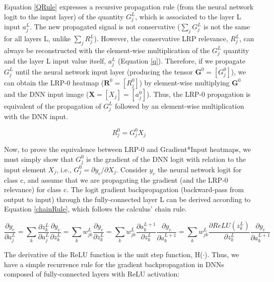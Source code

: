 \documentclass[fleqn,10pt]{wlscirep}
\begin{document}
{Equation \ref{QRule} expresses a recursive propagation rule (from the neural network logit to the input layer) of the quantity $G_{j}^{L}$, which is associated to the layer 
L input $a_{j}^{L}$. The new propagated signal is not conservative ($\sum_{j} G_{j}^{L}$ is not the same for all layers L, unlike $\sum_{j} R_{j}^{L}$). However, the conservative LRP relevance, $R_{j}^{L}$, can always be reconstructed with the element-wise multiplication of the $G_{j}^{L}$ quantity and the layer L input value itself, $a_{j}^{L}$ (Equation \ref{q}). Therefore, if we propagate $G_{j}^{L}$ until the neural network input layer (producing the tensor $\bm{G}^{0}=[G_{j}^{0}]$), we can obtain the LRP-0 heatmap ($\bm{R}^{0}=[R_{j}^{0}]$) by element-wise multiplying $\bm{G}^{0}$ and the DNN input image ($\bm{X}=[X_{j}]=[a_{j}^{0}]$). Thus, the LRP-0 propagation is equivalent of the propagation of $G_{j}^{L}$ followed by an element-wise multiplication with the DNN input.

\begin{equation}
R_{j}^{0}=G_{j}^{0}X_{j}
\end{equation}

Now, to prove the equivalence between LRP-0 and Gradient*Input heatmaps, we must simply show that $G_{j}^{0}$ is the gradient of the DNN logit with relation to the input element $X_{j}$, i.e., $G_{j}^{0}=\partial y_{c}/\partial X_{j}$. Consider $y_{c}$ the neural network logit for class c, and assume that we are propagating the gradient (and the LRP-0 relevance) for class c. The logit gradient backpropagation (backward-pass from output to input) through the fully-connected layer L can be derived according to Equation \ref{chainRule}, which follows the calculus' chain rule.

\begin{equation}
\label{chainRule}
    \frac{\partial y_{c}}{\partial a_{j}^{L}}= \sum_{k} \frac{\partial z_{k}^{L}}{\partial a_{j}^{L}} \frac{\partial y_{c}}{\partial z_{k}^{L}}= 
    \sum_{k}  w_{jk}^{L} \frac{\partial y_{c}}{\partial z_{k}^{L}}=
    \sum_{k}  w_{jk}^{L} \frac{\partial a_{k}^{L+1}}{\partial z_{k}^{L}}\frac{\partial y_{c}}{\partial a_{k}^{L+1}}=
    \sum_{k}  w_{jk}^{L} \frac{\partial ReLU(z_{k}^{L})}{\partial z_{k}^{L}}\frac{\partial y_{c}}{\partial a_{k}^{L+1}}
\end{equation}

The derivative of the ReLU function is the unit step function, H($\cdot$). Thus, we have a simple recurrence rule for the gradient backpropagation in DNNs composed of fully-connected layers with ReLU activation:

}
\end{document}
